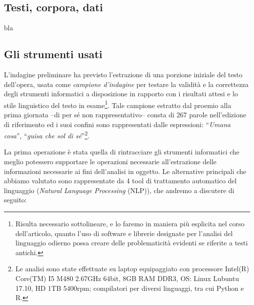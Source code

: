 \subsection{Testi, corpora, dati}\label{testi-corpora-dati}

\autocite{owens2011}

bla

\autocite{moretti2005}

\subsection{Gli strumenti usati}\label{gli-strumenti-usati}

L'indagine preliminare ha previsto l'estrazione di una porzione iniziale
del testo dell'opera, usata come \emph{campione d'indagine} per testare
la validità e la correttezza degli strumenti informatici a disposizione
in rapporto con i risultati attesi e lo stile linguistico del testo in
esame\footnote{Risulta necessario sottolineare, e lo faremo in maniera
  più esplicita nel corso dell'articolo, quanto l'uso di software e
  librerie designate per l'analisi del linguaggio odierno possa creare
  delle problematicità evidenti se riferite a testi antichi.}. Tale
campione estratto dal proemio alla prima giornata --di per sé non
rappresentativo-- consta di 267 parole nell'edizione di riferimento ed i
suoi confini sono rappresentati dalle espressioni: ``\emph{Umana
cosa}'', ``\emph{guisa che sol di sé}''\footnote{Le analisi sono state
  effettuate su laptop equipaggiato con processore Intel(R) Core(TM) I5
  M480 2.67GHz 64bit, 8GB RAM DDR3, OS: Linux Lubuntu 17.10, HD 1TB
  5400rpm; compilatori per diversi linguaggi, tra cui Python e R.}.

La prima operazione è stata quella di rintracciare gli strumenti
informatici che meglio potessero supportare le operazioni necessarie
all'estrazione delle informazioni necessarie ai fini dell'analisi in
oggetto. Le alternative principali che abbiamo valutato sono
rappresentate da 4 tool di trattamento automatico del linguaggio
(\emph{Natural Language Processing} (NLP)), che andremo a discutere di
seguito:

